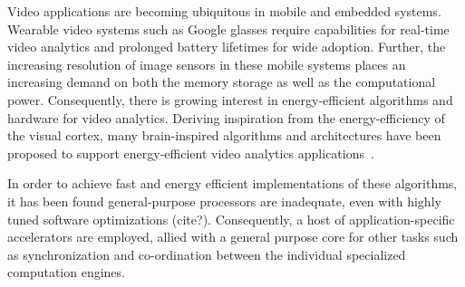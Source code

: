 Video applications are becoming ubiquitous in mobile and embedded systems. Wearable video systems such as Google glasses require capabilities for real-time video analytics and prolonged battery lifetimes for wide adoption.  Further, the increasing resolution of image sensors in these mobile systems places an increasing demand on both the memory storage as well as the computational power. Consequently, there is growing interest in energy-efficient algorithms and hardware for video analytics. 
Deriving inspiration from the energy-efficiency of the visual cortex, many brain-inspired algorithms and architectures have been proposed to support energy-efficient video analytics applications~\cite{Nere2011,Chen2014,Kestur2012,Maashri2012a,Farabet}. %

In order to achieve fast and energy efficient implementations of these algorithms, it has been found general-purpose processors are inadequate, even with highly tuned software optimizations (cite?). Consequently, a host of application-specific accelerators are employed, allied with a general purpose core for other tasks such as synchronization and co-ordination between the individual specialized computation engines. 


